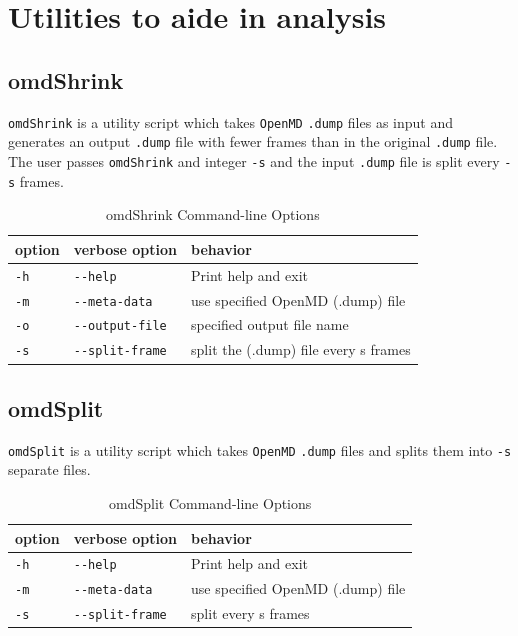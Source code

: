 \documentclass[letterpaper]{report}
\begin{document}
\section{\label{section:utilities}Utilities to aide in analysis}

\subsection{\label{section:omdShrink}omdShrink}
{\tt omdShrink} is a utility script which takes {\tt OpenMD} {\tt .dump}
files as input and generates an output {\tt .dump} file with fewer frames
than in the original {\tt .dump} file. The user passes {\tt omdShrink}
and integer {\tt -s} and the input {\tt .dump} file is split every {\tt -s} 
frames.

\begin{longtable}[c]{|EFG|}
\caption{omdShrink Command-line Options}
\\ \hline
{\bf option} & {\bf verbose option} & {\bf behavior} \\ \hline
\endhead
\hline
\endfoot
{\tt -h} & {\tt -{}-help}        & Print help and exit\\
{\tt -m} & {\tt -{}-meta-data}   & use specified OpenMD (.dump) file \\
{\tt -o} & {\tt -{}-output-file} & specified output file name \\
{\tt -s} & {\tt -{}-split-frame} & split the (.dump) file every s frames \\
\end{longtable}

\subsection{\label{section:omdSplit}omdSplit}
{\tt omdSplit} is a utility script which takes {\tt OpenMD} {\tt .dump}
files and splits them into {\tt -s} separate files.

\begin{longtable}[c]{|EFG|}
\caption{omdSplit Command-line Options}
\\ \hline
{\bf option} & {\bf verbose option} & {\bf behavior} \\ \hline
\endhead
\hline
\endfoot
{\tt -h} & {\tt -{}-help}        & Print help and exit\\
{\tt -m} & {\tt -{}-meta-data}   & use specified OpenMD (.dump) file \\
{\tt -s} & {\tt -{}-split-frame} & split every s frames \\
\end{longtable}
\end{document}
